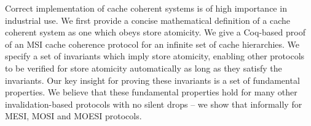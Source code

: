 Correct implementation of cache coherent systems is of high importance in
industrial use. We first provide a concise mathematical definition of a cache
coherent system as one which obeys store atomicity. We give a Coq-based proof
of an MSI cache coherence protocol for an infinite set of cache hierarchies. We
specify a set of invariants which imply store atomicity, enabling other
protocols to be verified for store atomicity automatically as long as they
satisfy the invariants. Our key insight for proving these invariants is a set
of fundamental properties.  We believe that these fundamental properties hold
for many other invalidation-based protocols with no silent drops -- we show
that informally for MESI, MOSI and MOESI protocols.


